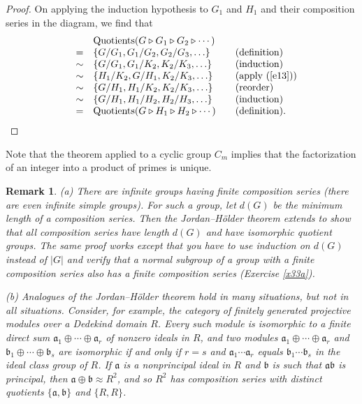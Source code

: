 \documentclass[a4paper,11pt,final]{memoir}%
\newtheorem{remark}[X]{Remark}
\theoremstyle{nonumberplain}
\newtheorem{proof}{Proof.}
\begin{document}
\begin{proof}
On applying the induction hypothesis to $G_{1}$ and $H_{1}$ and their
composition series in the diagram, we find that
\[%
\begin{array}
[c]{rclll}%
&&\text{Quotients}(G\triangleright G_{1}\triangleright G_{2}\triangleright
\cdots) \\
& = & \{G/G_{1},G_{1}/G_{2},G_{2}/G_{3},\ldots\} &  &
\text{(definition)}\\
& \sim & \{G/G_{1},G_{1}/K_{2},K_{2}/K_{3},\ldots\} &  & \text{(induction)}\\
& \sim & \{H_{1}/K_{2},G/H_{1},K_{2}/K_{3},\ldots\} &  & \text{(apply
(\ref{e13}))}\\
& \sim & \{G/H_{1},H_{1}/K_{2},K_{2}/K_{3},\ldots\} &  & \text{(reorder)}\\
& \sim & \{G/H_{1},H_{1}/H_{2},H_{2}/H_{3},\ldots\} &  & \text{(induction)}\\
& = & \text{Quotients}(G\triangleright H_{1}\triangleright H_{2}%
\triangleright\cdots) &  & \text{(definition).}%
\end{array}
\]

\end{proof}

Note that the theorem applied to a cyclic group $C_{m}$ implies that the
factorization of an integer into a product of primes is unique.

\begin{remark}
\label{ns03}(a) There are infinite groups having finite composition series
(there are even infinite simple groups). For such a group, let $d(G)$ be the
minimum length of a composition series. Then the Jordan--H\"{o}lder theorem
extends to show that all composition series have length $d(G)$ and have
isomorphic quotient groups. The same proof works except that you have to use
induction on $d(G)$ instead of $|G|$ and verify that a normal subgroup of a
group with a finite composition series also has a finite composition series
(Exercise \ref{x33a}).

(b) Analogues of the Jordan--H\"{o}lder theorem hold in many situations, but
not in all situations. Consider, for example, the category of finitely
generated projective modules over a Dedekind domain $R$. Every such module is
isomorphic to a finite direct sum $\mathfrak{a}_{1}\oplus\cdots\oplus
\mathfrak{a}_{r}$ of nonzero ideals in $R$, and two modules $\mathfrak{a}%
_{1}\oplus\cdots\oplus\mathfrak{a}_{r}$ and $\mathfrak{b}_{1}\oplus
\cdots\oplus\mathfrak{b}_{s}$ are isomorphic if and only if $r=s$ and
$\mathfrak{a}_{1}\cdots\mathfrak{a}_{r}$ equals $\mathfrak{b}_{1}%
\cdots\mathfrak{b}_{s}$ in the ideal class group of $R$. If $\mathfrak{a}$ is
a nonprincipal ideal in $R$ and $\mathfrak{b}$ is such that $\mathfrak{a}%
\mathfrak{b}$ is principal, then $\mathfrak{a}\oplus\mathfrak{b}\approx R^{2}%
$, and so $R^{2}$ has composition series with distinct quotients
$\{\mathfrak{a},\mathfrak{b}\}$ and $\{R,R\}$.
\end{remark}
\end{document}
